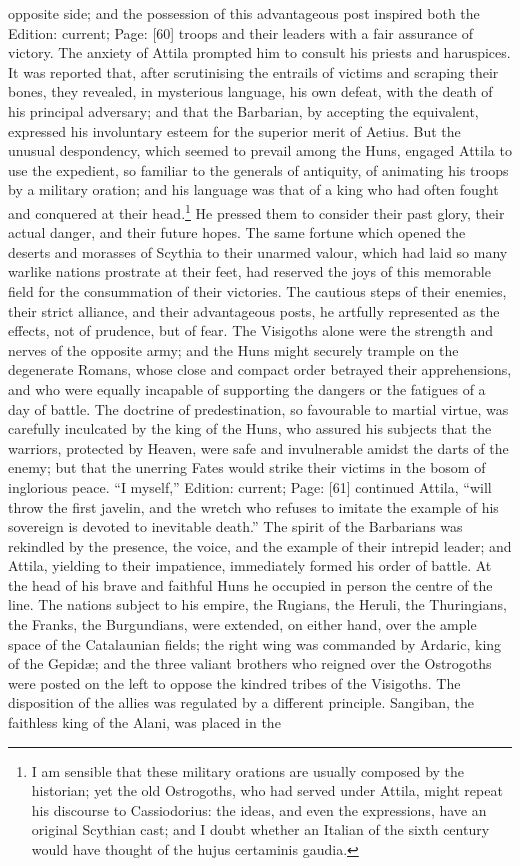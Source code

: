 opposite side; and the possession of this advantageous post inspired both the Edition: current; Page: [60] troops and their leaders with a fair assurance of victory. The anxiety of Attila prompted him to consult his priests and haruspices. It was reported that, after scrutinising the entrails of victims and scraping their bones, they revealed, in mysterious language, his own defeat, with the death of his principal adversary; and that the Barbarian, by accepting the equivalent, expressed his involuntary esteem for the superior merit of Aetius. But the unusual despondency, which seemed to prevail among the Huns, engaged Attila to use the expedient, so familiar to the generals of antiquity, of animating his troops by a military oration; and his language was that of a king who had often fought and conquered at their head.\footnote{I am sensible that these military orations are usually composed by the historian; yet the old Ostrogoths, who had served under Attila, might repeat his discourse to Cassiodorius: the ideas, and even the expressions, have an original Scythian cast; and I doubt whether an Italian of the sixth century would have thought of the hujus certaminis gaudia.} He pressed them to consider their past glory, their actual danger, and their future hopes. The same fortune which opened the deserts and morasses of Scythia to their unarmed valour, which had laid so many warlike nations prostrate at their feet, had reserved the joys of this memorable field for the consummation of their victories. The cautious steps of their enemies, their strict alliance, and their advantageous posts, he artfully represented as the effects, not of prudence, but of fear. The Visigoths alone were the strength and nerves of the opposite army; and the Huns might securely trample on the degenerate Romans, whose close and compact order betrayed their apprehensions, and who were equally incapable of supporting the dangers or the fatigues of a day of battle. The doctrine of predestination, so favourable to martial virtue, was carefully inculcated by the king of the Huns, who assured his subjects that the warriors, protected by Heaven, were safe and invulnerable amidst the darts of the enemy; but that the unerring Fates would strike their victims in the bosom of inglorious peace. \texthebrew{“}I myself,\texthebrew{}” Edition: current; Page: [61] continued Attila, \texthebrew{“}will throw the first javelin, and the wretch who refuses to imitate the example of his sovereign is devoted to inevitable death.\texthebrew{}” The spirit of the Barbarians was rekindled by the presence, the voice, and the example of their intrepid leader; and Attila, yielding to their impatience, immediately formed his order of battle. At the head of his brave and faithful Huns he occupied in person the centre of the line. The nations subject to his empire, the Rugians, the Heruli, the Thuringians, the Franks, the Burgundians, were extended, on either hand, over the ample space of the Catalaunian fields; the right wing was commanded by Ardaric, king of the Gepidæ; and the three valiant brothers who reigned over the Ostrogoths were posted on the left to oppose the kindred tribes of the Visigoths. The disposition of the allies was regulated by a different principle. Sangiban, the faithless king of the Alani, was placed in the 